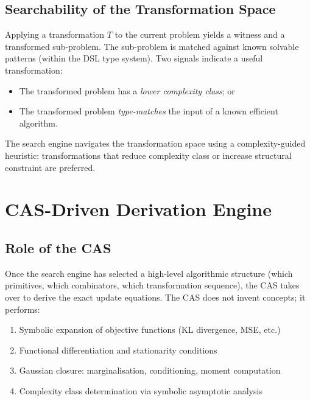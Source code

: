 \documentclass[12pt,a4paper]{article}
\begin{document}
\subsection{Searchability of the Transformation Space}

Applying a transformation $T$ to the current problem yields a witness and a
transformed sub-problem.  The sub-problem is matched against known solvable
patterns (within the DSL type system).  Two signals indicate a useful
transformation:
\begin{itemize}[itemsep=0pt]
  \item The transformed problem has a \emph{lower complexity class}; or
  \item The transformed problem \emph{type-matches} the input of a known
        efficient algorithm.
\end{itemize}

\noindent
The search engine navigates the transformation space using a
complexity-guided heuristic: transformations that reduce complexity class
or increase structural constraint are preferred.

\section{CAS-Driven Derivation Engine}
\label{sec:cas}

\subsection{Role of the CAS}

Once the search engine has selected a high-level algorithmic structure
(which primitives, which combinators, which transformation sequence), the
CAS takes over to derive the exact update equations.  The CAS does not
invent concepts; it performs:
\begin{enumerate}[itemsep=0pt]
  \item Symbolic expansion of objective functions (KL divergence, MSE, etc.)
  \item Functional differentiation and stationarity conditions
  \item Gaussian closure: marginalisation, conditioning, moment computation
  \item Complexity class determination via symbolic asymptotic analysis
\end{enumerate}
\end{document}
